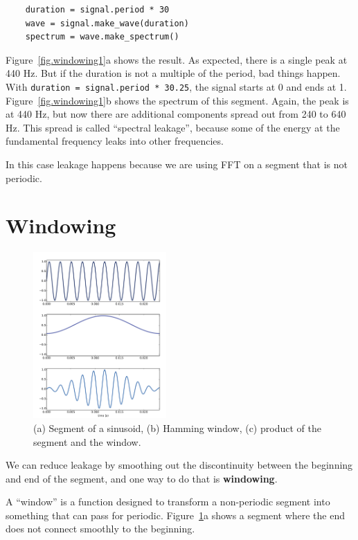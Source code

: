 \documentclass[12pt]{book}
\begin{document}
\begin{verbatim}
    duration = signal.period * 30
    wave = signal.make_wave(duration)
    spectrum = wave.make_spectrum()
\end{verbatim}

Figure~\ref{fig.windowing1}a shows the result.  As expected, there is
a single peak at 440 Hz.  But if the duration is not a multiple of the
period, bad things happen.  With {\tt duration = signal.period *
  30.25}, the signal starts at 0 and ends at 1.
Figure~\ref{fig.windowing1}b shows the spectrum of this segment.
Again, the peak is at 440 Hz, but now there are additional components
spread out from 240 to 640 Hz.  This spread is called ``spectral
leakage'', because some of the energy at the fundamental frequency
leaks into other frequencies.

In this case leakage happens because we are using FFT on a segment
that is not periodic.


\section{Windowing}

\begin{figure}
\centerline{\includegraphics[height=2.5in]{figs/windowing2.pdf}}
\caption{(a) Segment of a sinusoid, (b) Hamming window, (c) product
of the segment and the window.}
\label{fig.windowing2}
\end{figure}

We can reduce leakage by smoothing out the discontinuity between
the beginning and end of the segment, and one way to do that is
{\bf windowing}.

A ``window'' is a function designed to transform a non-periodic
segment into something that can pass for periodic.
Figure~\ref{fig.windowing2}a shows a segment where the end does not
connect smoothly to the beginning.
\end{document}
